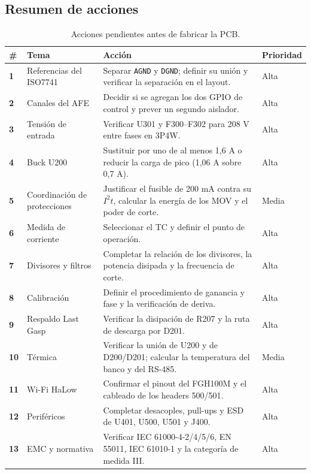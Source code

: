 \documentclass[11pt,a4paper]{article}
\begin{document}
\subsection{Resumen de acciones}

\begin{table}[H]
\centering
\caption{Acciones pendientes antes de fabricar la PCB.}
\label{tab:acciones}
\footnotesize
\begin{tabularx}{\textwidth}{@{}>{\bfseries}p{0.7cm} >{\raggedright\arraybackslash}p{4.4cm} >{\raggedright\arraybackslash}X >{\raggedright\arraybackslash}p{1.5cm}@{}}
\toprule
\textbf{\#} & \textbf{Tema} & \textbf{Acción} & \textbf{Prioridad} \\
\midrule
1 & Referencias del ISO7741 & Separar \texttt{AGND} y \texttt{DGND}; definir su unión y verificar la separación en el layout. & Alta \\
2 & Canales del AFE & Decidir si se agregan los dos GPIO de control y prever un segundo aislador. & Alta \\
3 & Tensión de entrada & Verificar U301 y F300--F302 para 208 V entre fases en 3P4W. & Alta \\
4 & Buck U200 & Sustituir por uno de al menos 1,6 A o reducir la carga de pico (1,06 A sobre 0,7 A). & Alta \\
5 & Coordinación de protecciones & Justificar el fusible de 200 mA contra su $I^2t$, calcular la energía de los MOV y el poder de corte. & Media \\
6 & Medida de corriente & Seleccionar el TC y definir el punto de operación. & Alta \\
7 & Divisores y filtros & Completar la relación de los divisores, la potencia disipada y la frecuencia de corte. & Alta \\
8 & Calibración & Definir el procedimiento de ganancia y fase y la verificación de deriva. & Alta \\
9 & Respaldo Last Gasp & Verificar la disipación de R207 y la ruta de descarga por D201. & Alta \\
10 & Térmica & Verificar la unión de U200 y de D200/D201; calcular la temperatura del banco y del RS-485. & Media \\
11 & Wi-Fi HaLow & Confirmar el pinout del FGH100M y el cableado de los headers 500/501. & Alta \\
12 & Periféricos & Completar desacoples, pull-ups y ESD de U401, U500, U501 y J400. & Alta \\
13 & EMC y normativa & Verificar IEC 61000-4-2/4/5/6, EN 55011, IEC 61010-1 y la categoría de medida III. & Alta \\
\bottomrule
\end{tabularx}
\end{table}
\end{document}
